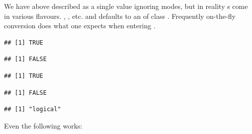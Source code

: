 \documentclass[krantz2]{krantz}\usepackage{knitr}%
\begin{document}
\begin{explainbox}
We have above described  as a single value ignoring modes, but in reality s come in various flavours. , , etc. and  defaults to an  of class . Frequently on-the-fly conversion does what one expects when entering .

\begin{knitrout}\footnotesize
{}\color{fgcolor}\begin{kframe}
\begin{alltt}
 \hlkwb{<-} \hlstd{(}\hlstd{,} \hlstd{)}
\hlstd{(a[}\hlstd{])}
\end{alltt}
\begin{verbatim}
## [1] TRUE
\end{verbatim}
\begin{alltt}
\hlstd{(}\hlstd{)}
\end{alltt}
\begin{verbatim}
## [1] FALSE
\end{verbatim}
\begin{alltt}
 \hlkwb{<-} \hlstd{(}\hlstd{,} \hlstd{)}
\hlstd{(b[}\hlstd{])}
\end{alltt}
\begin{verbatim}
## [1] TRUE
\end{verbatim}
\begin{alltt}
\hlstd{(}\hlstd{)}
\end{alltt}
\begin{verbatim}
## [1] FALSE
\end{verbatim}
\begin{alltt}
\hlstd{(}\hlstd{)}
\end{alltt}
\begin{verbatim}
## [1] "logical"
\end{verbatim}
\end{kframe}
\end{knitrout}

Even the following works:

\begin{knitrout}\footnotesize
{}\color{fgcolor}\begin{kframe}
\begin{alltt}
\hlstd{a[}\hlstd{]} \hlkwb{<-} \hlstd{b[}\hlstd{]}
\end{alltt}
\end{kframe}
\end{knitrout}


\end{explainbox}
\end{document}
